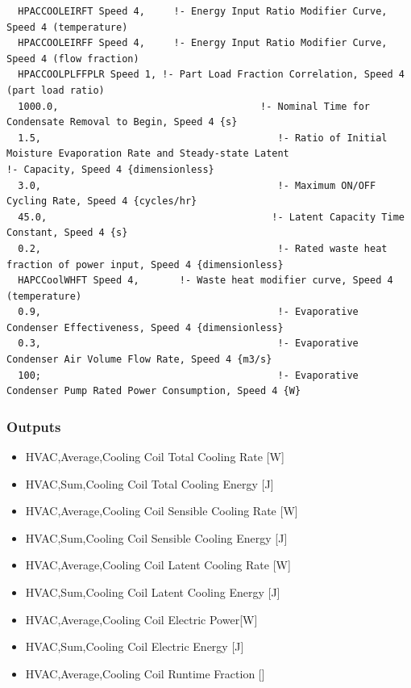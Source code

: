 \begin{lstlisting}
  HPACCOOLEIRFT Speed 4,     !- Energy Input Ratio Modifier Curve, Speed 4 (temperature)
  HPACCOOLEIRFF Speed 4,     !- Energy Input Ratio Modifier Curve, Speed 4 (flow fraction)
  HPACCOOLPLFFPLR Speed 1, !- Part Load Fraction Correlation, Speed 4 (part load ratio)
  1000.0,                                   !- Nominal Time for Condensate Removal to Begin, Speed 4 {s}
  1.5,                                         !- Ratio of Initial Moisture Evaporation Rate and Steady-state Latent                                                     !- Capacity, Speed 4 {dimensionless}
  3.0,                                         !- Maximum ON/OFF Cycling Rate, Speed 4 {cycles/hr}
  45.0,                                       !- Latent Capacity Time Constant, Speed 4 {s}
  0.2,                                         !- Rated waste heat fraction of power input, Speed 4 {dimensionless}
  HAPCCoolWHFT Speed 4,       !- Waste heat modifier curve, Speed 4 (temperature)
  0.9,                                         !- Evaporative Condenser Effectiveness, Speed 4 {dimensionless}
  0.3,                                         !- Evaporative Condenser Air Volume Flow Rate, Speed 4 {m3/s}
  100;                                         !- Evaporative Condenser Pump Rated Power Consumption, Speed 4 {W}
\end{lstlisting}

\subsubsection{Outputs}\label{outputs-12-002}

\begin{itemize}
\item
  HVAC,Average,Cooling Coil Total Cooling Rate {[}W{]}
\item
  HVAC,Sum,Cooling Coil Total Cooling Energy {[}J{]}
\item
  HVAC,Average,Cooling Coil Sensible Cooling Rate {[}W{]}
\item
  HVAC,Sum,Cooling Coil Sensible Cooling Energy {[}J{]}
\item
  HVAC,Average,Cooling Coil Latent Cooling Rate {[}W{]}
\item
  HVAC,Sum,Cooling Coil Latent Cooling Energy {[}J{]}
\item
  HVAC,Average,Cooling Coil Electric Power{[}W{]}
\item
  HVAC,Sum,Cooling Coil Electric Energy {[}J{]}
\item
  HVAC,Average,Cooling Coil Runtime Fraction {[]}
\end{itemize}

